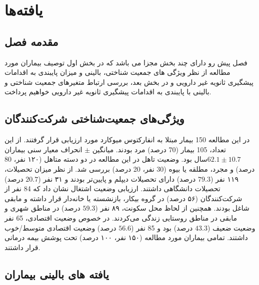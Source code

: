 \ChapterStart
\chapter{یافته‌ها}
\label{ch:results}

\section{مقدمه فصل}
\label{sec:ch4-intro}


فصل پیش رو دارای چند بخش مجزا می باشد که در بخش اول توصیف بیماران مورد مطالعه از نظر ویژگی های جمعیت شناختی، بالینی و میزان پایبندی به اقدامات پیشگیری ثانویه غیر دارویی و در بخش بعد، بررسی ارتباط متغیرهای جمعیت شناختی و بالینی با پایبندی به اقدامات پیشگیری ثانویه غیر دارویی خواهیم پرداخت.


\section{ویژگی‌های جمعیت‌شناختی شرکت‌کنندگان}
\label{sec:demographics}


در این مطالعه 150 بیمار مبتلا به انفارکتوس میوکارد مورد ارزیابی قرار گرفتند. از این تعداد، 105 بیمار (70 درصد) مرد بودند. میانگین $\pm$ انحراف معیار سنی بیماران $62.1 \pm 10.7$سال بود. وضعیت تاهل در این مطالعه در دو دسته متاهل (۱۲۰ نفر، 80 درصد) و مجرد، مطلقه‌ یا بیوه (30 نفر، 20 درصد) بررسی شد. از نظر میزان تحصیلات، ۱۱۹ نفر ($79.3$ درصد) دارای تحصیلات دیپلم و پایین‌تر بودند و ۳۱ نفر ($20.7$ درصد) تحصیلات دانشگاهی داشتند. ارزیابی وضعیت اشتغال نشان داد که 84 نفر از شرکت‌کنندگان (۵۶ درصد) در گروه بیکار، بازنشسته یا خانه‌دار قرار داشته و مابقی شاغل بودند. همچنین از لحاظ محل سکونت، ۸۹ نفر ($59.3$ درصد) در مناطق شهری و مابقی در مناطق روستایی زندگی می‌کردند. در خصوص وضعیت اقتصادی، 65 نفر وضعیت ضعیف ($43.3$ درصد) بود و 85 نفر ($56.6$ درصد) وضعیت اقتصادی متوسط/خوب داشتند. تمامی بیماران مورد مطالعه (۱۵۰ نفر، ۱۰۰ درصد) تحت پوشش بیمه درمانی قرار داشتند.

\section{یافته های بالینی بیماران}


